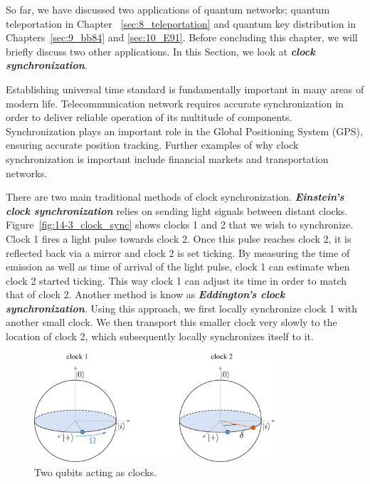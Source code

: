 So far, we have discussed two applications of quantum networks; quantum teleportation in Chapter ~\ref{sec:8_teleportation} and quantum key distribution in Chapters~\ref{sec:9_bb84} and \ref{sec:10_E91}.
Before concluding this chapter, we will briefly discuss two other applications.
In this Section, we look at \textbf{\textit{clock synchronization}}.

Establishing universal time standard is fundamentally important in many areas of modern life.
Telecommunication network requires accurate synchronization in order to deliver reliable operation of its multitude of components.
Synchronization plays an important role in the Global Positioning System (GPS), ensuring accurate position tracking.
Further examples of why clock synchronization is important include financial markets and transportation networks.

There are two main traditional methods of clock synchronization.
\textbf{\textit{Einstein's clock synchronization}} relies on sending light signals between distant clocks.
Figure~\ref{fig:14-3_clock_sync} shows clocks 1 and 2 that we wish to synchronize.
Clock 1 fires a light pulse towards clock 2.
Once this pulse reaches clock 2, it is reflected back via a mirror and clock 2 is set ticking.
By measuring the time of emission as well as time of arrival of the light pulse, clock 1 can estimate when clock 2 started ticking.
This way clock 1 can adjust its time in order to match that of clock 2.
Another method is know as \textbf{\textit{Eddington's clock synchronization}}.
Using this approach, we first locally synchronize clock 1 with another small clock.
We then transport this smaller clock very slowly to the location of clock 2, which subsequently locally synchronizes itself to it.

\begin{figure}[t]
    \centering
    \includegraphics[width=0.8\textwidth]{lesson14/14-3_bloch.pdf}
    \caption[Qubit clocks.]{Two qubits acting as clocks.}
    \label{fig:14-3_bloch}
\end{figure}

